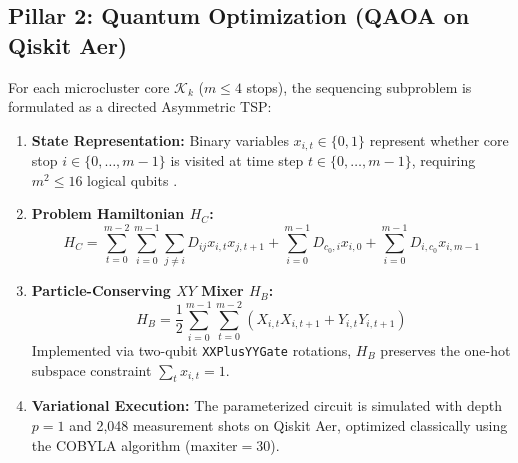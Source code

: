\documentclass[journal,10pt]{IEEEtran}
\begin{document}
\subsection{Pillar 2: Quantum Optimization (QAOA on Qiskit Aer)}
For each microcluster core $\mathcal{K}_k$ ($m \le 4$ stops), the sequencing subproblem is formulated as a directed Asymmetric TSP:
\begin{enumerate}
    \item \textbf{State Representation:} Binary variables $x_{i, t} \in \{0, 1\}$ represent whether core stop $i \in \{0, \dots, m-1\}$ is visited at time step $t \in \{0, \dots, m-1\}$, requiring $m^2 \le 16$ logical qubits \cite{lucas2014ising}.
    \item \textbf{Problem Hamiltonian $H_C$:}
    \begin{equation}
    H_C = \sum_{t=0}^{m-2} \sum_{i=0}^{m-1} \sum_{j \ne i} D_{ij} x_{i, t} x_{j, t+1} + \sum_{i=0}^{m-1} D_{c_0, i} x_{i, 0} + \sum_{i=0}^{m-1} D_{i, c_0} x_{i, m-1}
    \end{equation}
    \item \textbf{Particle-Conserving $XY$ Mixer $H_B$:}
    \begin{equation}
    H_B = \frac{1}{2} \sum_{i=0}^{m-1} \sum_{t=0}^{m-2} \left( X_{i, t} X_{i, t+1} + Y_{i, t} Y_{i, t+1} \right)
    \end{equation}
    Implemented via two-qubit \texttt{XXPlusYYGate} rotations, $H_B$ preserves the one-hot subspace constraint $\sum_t x_{i, t} = 1$.
    \item \textbf{Variational Execution:} The parameterized circuit is simulated with depth $p=1$ and 2,048 measurement shots on Qiskit Aer, optimized classically using the COBYLA algorithm ($\text{maxiter}=30$).
\end{enumerate}
\end{document}
